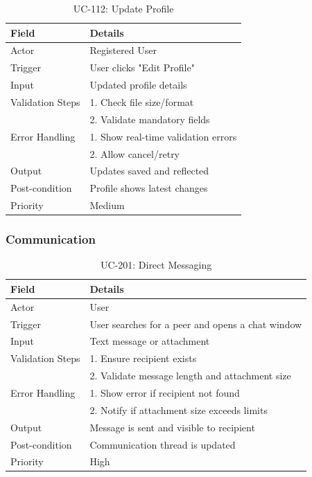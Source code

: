 \begin{table}[H]
\centering
\caption{UC-112: Update Profile}
\begin{tabular}{|l|p{10cm}|}
\hline
\textbf{Field} & \textbf{Details} \\ \hline
Actor & Registered User \\ \hline
Trigger & User clicks "Edit Profile" \\ \hline
Input & Updated profile details \\ \hline
Validation Steps & 1. Check file size/format \\ 
                 & 2. Validate mandatory fields \\ \hline
Error Handling & 1. Show real-time validation errors \\ 
               & 2. Allow cancel/retry \\ \hline
Output & Updates saved and reflected \\ \hline
Post-condition & Profile shows latest changes \\ \hline
Priority & Medium \\ \hline
\end{tabular}
\end{table}


\subsubsection{Communication}
\begin{table}[H]
\centering
\caption{UC-201: Direct Messaging}
\begin{tabular}{|l|p{10cm}|}
\hline
\textbf{Field} & \textbf{Details} \\ \hline
Actor & User \\ \hline
Trigger & User searches for a peer and opens a chat window \\ \hline
Input & Text message or attachment \\ \hline
Validation Steps & 1. Ensure recipient exists \\ 
                 & 2. Validate message length and attachment size \\ \hline
Error Handling & 1. Show error if recipient not found \\ 
               & 2. Notify if attachment size exceeds limits \\ \hline
Output & Message is sent and visible to recipient \\ \hline
Post-condition & Communication thread is updated \\ \hline
Priority & High \\ \hline
\end{tabular}
\end{table}

